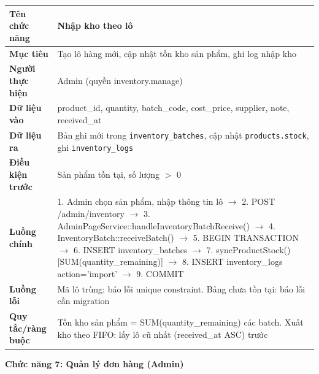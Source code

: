 \documentclass[a4paper]{article}
\begin{document}
\begin{longtable}{|p{3.5cm}|p{10.5cm}|}
\hline
\textbf{Tên chức năng} & Nhập kho theo lô \\
\hline
\textbf{Mục tiêu} & Tạo lô hàng mới, cập nhật tồn kho sản phẩm, ghi log nhập kho \\
\hline
\textbf{Người thực hiện} & Admin (quyền inventory.manage) \\
\hline
\textbf{Dữ liệu vào} & product\_id, quantity, batch\_code, cost\_price, supplier, note, received\_at \\
\hline
\textbf{Dữ liệu ra} & Bản ghi mới trong \texttt{inventory\_batches}, cập nhật \texttt{products.stock}, ghi \texttt{inventory\_logs} \\
\hline
\textbf{Điều kiện trước} & Sản phẩm tồn tại, số lượng $>$ 0 \\
\hline
\textbf{Luồng chính} & 1. Admin chọn sản phẩm, nhập thông tin lô $\to$ 2. POST /admin/inventory $\to$ 3. AdminPageService::handleInventoryBatchReceive() $\to$ 4. InventoryBatch::receiveBatch() $\to$ 5. BEGIN TRANSACTION $\to$ 6. INSERT inventory\_batches $\to$ 7. syncProductStock() [SUM(quantity\_remaining)] $\to$ 8. INSERT inventory\_logs action='import' $\to$ 9. COMMIT \\
\hline
\textbf{Luồng lỗi} & Mã lô trùng: báo lỗi unique constraint. Bảng chưa tồn tại: báo lỗi cần migration \\
\hline
\textbf{Quy tắc/ràng buộc} & Tồn kho sản phẩm = SUM(quantity\_remaining) các batch. Xuất kho theo FIFO: lấy lô cũ nhất (received\_at ASC) trước \\
\hline
\end{longtable}

\vspace{0.5cm}
\noindent\textbf{Chức năng 7: Quản lý đơn hàng (Admin)}
\end{document}
